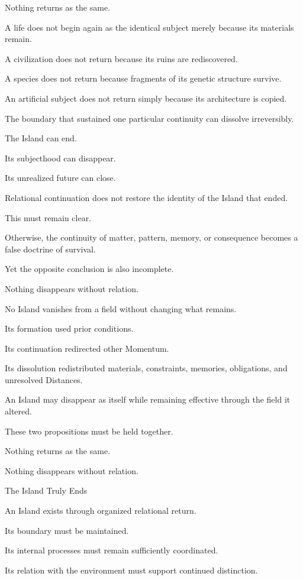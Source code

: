 Nothing returns as the same.

A life does not begin again as the identical subject merely because its materials remain.

A civilization does not return because its ruins are rediscovered.

A species does not return because fragments of its genetic structure survive.

An artificial subject does not return simply because its architecture is copied.

The boundary that sustained one particular continuity can dissolve irreversibly.

The Island can end.

Its subjecthood can disappear.

Its unrealized future can close.

Relational continuation does not restore the identity of the Island that ended.

This must remain clear.

Otherwise, the continuity of matter, pattern, memory, or consequence becomes a false doctrine of survival.

Yet the opposite conclusion is also incomplete.

Nothing disappears without relation.

No Island vanishes from a field without changing what remains.

Its formation used prior conditions.

Its continuation redirected other Momentum.

Its dissolution redistributed materials, constraints, memories, obligations, and unresolved Distances.

An Island may disappear as itself while remaining effective through the field it altered.

These two propositions must be held together.

Nothing returns as the same.

Nothing disappears without relation.

The Island Truly Ends

An Island exists through organized relational return.

Its boundary must be maintained.

Its internal processes must remain sufficiently coordinated.

Its relation with the environment must support continued distinction.

